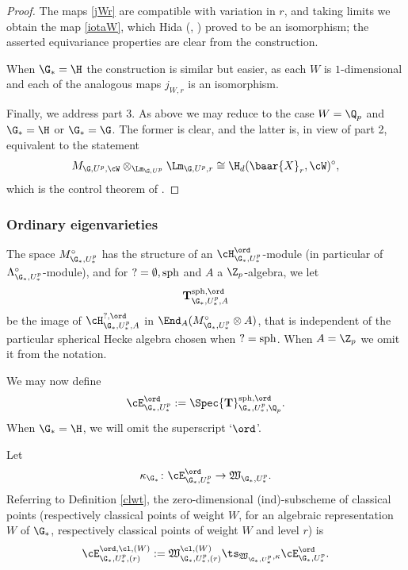 \begin{proof}
The maps \eqref{jWr}  are compatible with variation in $r$, and taking limits  we obtain the map \eqref{iotaW}, which Hida  (\cite[\S~ 8]{Hida88},   \cite[Theorem 2.4]{hida-luminy}) proved to be an isomorphism; the asserted equivariance  properties are clear from the construction.







When $\G_{*}=\H$ the construction is similar but  easier, as each $W$ is $1$-dimensional and each of the analogous maps $j_{W,r}$ is an isomorphism.

Finally, we address part 3. As above we may reduce to the case $W=\Q_{p}$ and $\G_{*}=\H$ or $\G_{*}=\G$. The former is clear, and the latter is, in view of part 2, equivalent to the statement
$$M_{\G, U^{p}, \cW}\otimes_{\Lm_{\G, U^{p}}} \Lm_{\G, U^{p}, r}\cong \H_{d}(\baar{X}_{r},  \cW)^{\circ},$$
which is the control theorem of
 \cite[Theorem 1.2 (3)]{hida-luminy}.
\end{proof}


\subsubsection{Ordinary eigenvarieties}

The space  $M^{\circ}_{\G_{*}, U^{p}_{*}}$ has the structure of an $\cH_{\G_{*}, U^{p}_{*}}^{ \ord}$-module (in particular of $\Lambda^{\circ}_{\G_{*}, U^{p}_{*}}$-module), and for $?=\emptyset, {\rm sph}$ and $A$ a $\Z_{p}$-algebra,   we let
$${\bf T}_{\G_{*}, U^{p}_{*}, A}^{{\rm sph}, \ord}$$
   be the image of  $\cH_{\G_{*}, U^{p}_{*}, A}^{{\rm ?}, \ord}$ in $\End_{A}(M^{\circ}_{\G_{*}, U^{p}_{*}}\otimes A)$,  that  is independent of the particular spherical Hecke algebra chosen when $?={\rm sph}$.  When $A=\Z_{p}$ we omit it from the notation.

We may now define
  $$\cE^{\ord}_{\G_{*}, U_{*}^{p}} :=\Spec {\bf T}_{\G_{*}, U^{p}_{*}, \Q_{p}}^{{\rm sph}, \ord}.$$
  When $\G_{*}=\H$, we will omit the superscript `${\ord}$'.

Let
   $$\kappa_{\G_{*}}\colon \cE^{\ord}_{\G_{*}, U_{*}^{p}}  \to  \mathfrak{W}_{\G_{*}, U^{p}_{*}}  .$$
Referring to Definition \ref{clwt}, the zero-dimensional  (ind)-subscheme of classical points (respectively classical points of weight $W$, for an algebraic representation $W$ of $\G_{*}$, respectively classical points of weight $W$ and level $r$) is
  $$\cE^{\ord, \cl, (W)}_{\G_{*}, U^{p}_{*}, (r)} := \mathfrak{W}_{\G_{*}, U^{p}_{*},(r)}^{\cl, (W)}     \ts_{ \mathfrak{W}_{\G_{*}, U^{p}_{*}}, \kappa} \cE^{\ord}_{\G_{*}, U_{*}^{p}}. $$

